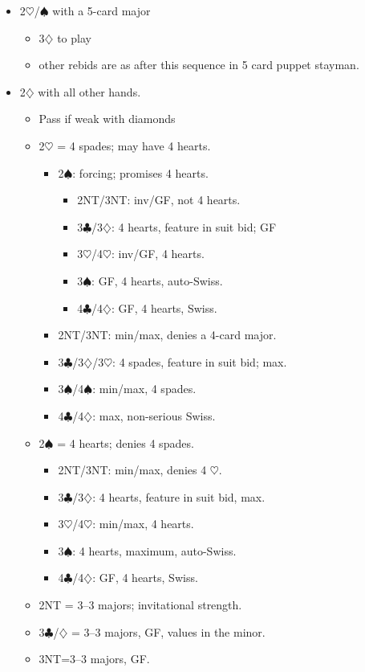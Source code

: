 \documentclass[a4paper,12pt]{article}
\begin{document}
	\begin{itemize}
	\item 2$\heartsuit$/$\spadesuit$ with a 5-card major
		\begin{itemize}
		\item 3$\diamondsuit$ to play
		\item other rebids are as after this sequence in 5 card puppet stayman.
		\end{itemize}
	\item 2$\diamondsuit$ with all other hands. 
		\begin{itemize}
		\item Pass if weak with diamonds
		\item 2$\heartsuit$ = 4 spades; may have 4 hearts.
			\begin{itemize}
			\item 2$\spadesuit$: forcing; promises 4 hearts.
				\begin{itemize}
				\item 2NT/3NT: inv/GF, not 4 hearts.
				\item 3$\clubsuit$/3$\diamondsuit$: 4 hearts, feature in suit bid; GF
				\item 3$\heartsuit$/4$\heartsuit$: inv/GF, 4 hearts.
				\item 3$\spadesuit$: GF, 4 hearts, auto-Swiss.
				\item 4$\clubsuit$/4$\diamondsuit$: GF, 4 hearts, Swiss.
				\end{itemize}
			\item 2NT/3NT: min/max, denies a 4-card major.
			\item 3$\clubsuit$/3$\diamondsuit$/3$\heartsuit$: 4 spades, feature in suit bid; max.
			\item 3$\spadesuit$/4$\spadesuit$: min/max, 4 spades.
			\item 4$\clubsuit$/4$\diamondsuit$: max, non-serious Swiss.
			\end{itemize}

		\item 2$\spadesuit$ = 4 hearts; denies 4 spades.
			\begin{itemize}
			\item 2NT/3NT: min/max, denies 4 $\heartsuit$.
			\item 3$\clubsuit$/3$\diamondsuit$: 4 hearts, feature in suit bid, max.
			\item 3$\heartsuit$/4$\heartsuit$: min/max, 4 hearts.
			\item 3$\spadesuit$: 4 hearts, maximum, auto-Swiss.
			\item 4$\clubsuit$/4$\diamondsuit$: GF, 4 hearts, Swiss.
			\end{itemize}

		\item 2NT = 3--3 majors; invitational strength.
		\item 3$\clubsuit$/$\diamondsuit$ = 3--3 majors, GF, values in the minor.
		\item 3NT=3--3 majors, GF.
		\end{itemize}
	\end{itemize}
\end{document}
